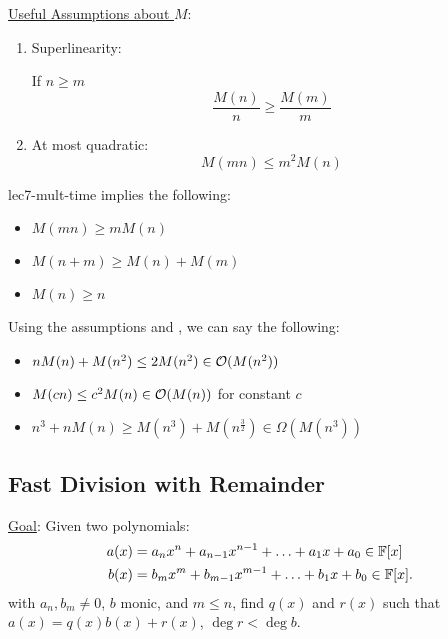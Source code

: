 \ul{Useful Assumptions about $M$}:
\begin{enumerate}
    \item Superlinearity: 
    
    If $n \geq m$ 
    \begin{equation}\label{eq:lec7-mult-time-superlinearity}
        \frac{M(n)}{n} \geq \frac{M(m)}{m}
    \end{equation}
    
    \item At most quadratic:
    \begin{equation}\label{eq:lec7-mult-time-quadratic}
        M(mn) \leq m^2M(n)
    \end{equation}
\end{enumerate}

\begin{proposition}{}{lec7-mult-time}
     implies the following:
    \begin{itemize}
        \item $M(mn) \geq mM(n)$
        \item $M(n + m) \geq M(n) + M(m)$
        \item $M(n) \geq n$
    \end{itemize}
\end{proposition}

\begin{example}{}{}
    Using the assumptions and , we can say the following:
    \begin{itemize}
        \item $nM(n) + M(n^2) \leq 2M(n^2) \in \operatorname{\mathcal{O}}(M(n^2))$
        \item $M(cn) \leq c^2M(n) \in \operatorname{\mathcal{O}}(M(n))$ for constant $c$ 
        \item $n^3 + nM(n) \geq M(n^3) + M(n^{\frac{3}{2}}) \in \Omega(M(n^3))$
    \end{itemize}
\end{example}

\subsection{Fast Division with Remainder}
\ul{Goal}: Given two polynomials: 
\begin{align*}
    a(x) &= a_nx^n + a_{n-1}x^{n-1} + \ldots + a_1x + a_0 \in \operatorname{\mathbb{F}}[x] \\
    b(x) &= b_mx^m + b_{m-1}x^{m-1} + \ldots + b_1x + b_0 \in \operatorname{\mathbb{F}}[x].
\end{align*} 
with $a_n, b_m \neq 0$, $b$ monic, and $m \leq n$, find $q(x)$ and $r(x)$ such that $a(x) = q(x)b(x) + r(x)$, $\deg r < \deg b$.

